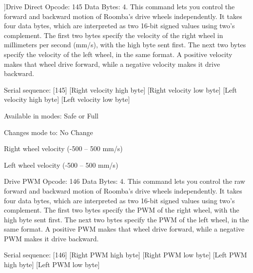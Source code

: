 \begin{Desc}
\begin{description}
{}]Drive Direct Opcode\+: 145 Data Bytes\+: 4. This command lets you control the forward and backward motion of Roomba’s drive wheels independently. It takes four data bytes, which are interpreted as two 16-\/bit signed values using two’s complement. The first two bytes specify the velocity of the right wheel in millimeters per second (mm/s), with the high byte sent first. The next two bytes specify the velocity of the left wheel, in the same format. A positive velocity makes that wheel drive forward, while a negative velocity makes it drive backward.
\begin{DoxyItemize}
\item Serial sequence\+: \mbox{[}145\mbox{]} \mbox{[}Right velocity high byte\mbox{]} \mbox{[}Right velocity low byte\mbox{]} \mbox{[}Left velocity high byte\mbox{]} \mbox{[}Left velocity low byte\mbox{]}
\item Available in modes\+: Safe or Full
\item Changes mode to\+: No Change
\item Right wheel velocity (-\/500 – 500 mm/s)
\item Left wheel velocity (-\/500 – 500 mm/s) 
\end{DoxyItemize}\item[{\em 
\hypertarget{group__roomba-lib_gga305e17dfb7050ad83ea49ded2e6a2e24a6c802b8d83b06edb676b7f777f4ebecc}{}R\+O\+O\+M\+B\+A\+\_\+\+D\+R\+I\+V\+E\+\_\+\+P\+W\+M\label{group__roomba-lib_gga305e17dfb7050ad83ea49ded2e6a2e24a6c802b8d83b06edb676b7f777f4ebecc}
}]Drive P\+W\+M Opcode\+: 146 Data Bytes\+: 4. This command lets you control the raw forward and backward motion of Roomba’s drive wheels independently. It takes four data bytes, which are interpreted as two 16-\/bit signed values using two’s complement. The first two bytes specify the P\+W\+M of the right wheel, with the high byte sent first. The next two bytes specify the P\+W\+M of the left wheel, in the same format. A positive P\+W\+M makes that wheel drive forward, while a negative P\+W\+M makes it drive backward.
\begin{DoxyItemize}
\item Serial sequence\+: \mbox{[}146\mbox{]} \mbox{[}Right P\+W\+M high byte\mbox{]} \mbox{[}Right P\+W\+M low byte\mbox{]} \mbox{[}Left P\+W\+M high byte\mbox{]} \mbox{[}Left P\+W\+M low byte\mbox{]}

\end{DoxyItemize}
\end{description}
\end{Desc}
